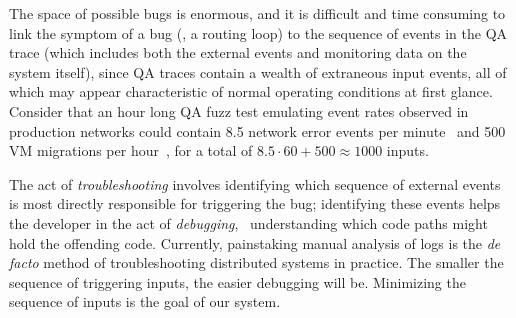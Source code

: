 The space of possible bugs is enormous, and it is difficult and time
consuming to link the
symptom of a bug (\eg, a routing loop) to the sequence of events in the QA
trace (which includes both the external events and monitoring data on the
system itself), since QA traces contain a wealth
of extraneous input events, all of which may appear characteristic of normal
operating conditions at first glance. Consider that an hour long QA fuzz test
emulating event rates observed in production networks could contain 8.5 network error events per
minute~\cite{Greenberg:2009:VSF:1592568.1592576} and 500 VM migrations per
hour~\cite{Soundararajan:2010:CBS:1899928.1899941},
for a total of $8.5 \cdot 60 + 500 \approx 1000$ inputs.

The act of {\em troubleshooting} involves identifying which sequence of
external events is most directly responsible for triggering the bug;
identifying these events helps the developer in the act of {\em debugging},
\ie~understanding which code paths might
hold the offending code. Currently, painstaking manual analysis of logs is the {\em de facto} method of troubleshooting distributed systems in practice.
The smaller the sequence of triggering inputs, the easier debugging will
be. Minimizing the sequence of inputs is the goal of our system.

